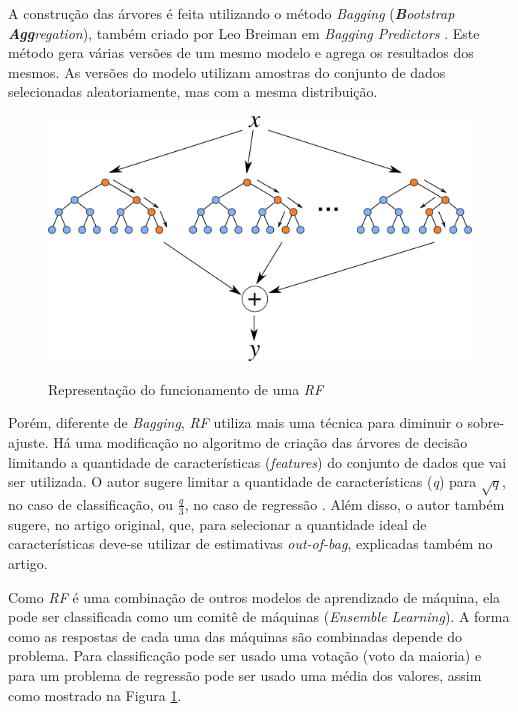 A construção das árvores é feita utilizando o método \textit{Bagging} (\textit{\textbf{B}ootstrap \textbf{Agg}regation}), também criado por Leo Breiman em \textit{Bagging Predictors} \cite{Breiman:1996:BP:231986.231989}. Este método gera várias versões de um mesmo modelo e agrega os resultados dos mesmos. As versões do modelo utilizam amostras do conjunto de dados selecionadas aleatoriamente, mas com a mesma distribuição.

\begin{figure}[htbp]
    \centering
    \includegraphics[scale=1.0]{monography/img/models/random_forest.png}
    \label{figure:random_forest}
    \caption[Representação do funcionamento de uma \textit{\acrshort{RF}}]{Representação do funcionamento de uma \textit{\acrshort{RF}}\footnotemark}
\end{figure}


Porém, diferente de \textit{Bagging}, \textit{\acrshort{RF}} utiliza mais uma técnica para diminuir o sobre-ajuste. Há uma modificação no algoritmo de criação das árvores de decisão limitando a quantidade de características (\textit{features}) do conjunto de dados que vai ser utilizada. O autor sugere limitar a quantidade de características (\textit{q}) para $ \sqrt{q} $, no caso de classificação, ou $ \frac{q}{3} $, no caso de regressão \cite{hastie2005elements}. Além disso, o autor também sugere, no artigo original, que, para selecionar a quantidade ideal de características deve-se utilizar de estimativas \textit{out-of-bag}, explicadas também no artigo.

Como \textit{\acrshort{RF}} é uma combinação de outros modelos de aprendizado de máquina, ela pode ser classificada como um comitê de máquinas (\textit{Ensemble Learning}). A forma como as respostas de cada uma das máquinas são combinadas depende do problema. Para classificação pode ser usado uma votação (voto da maioria) e para um problema de regressão pode ser usado uma média dos valores, assim como mostrado na Figura \ref{figure:random_forest}.

